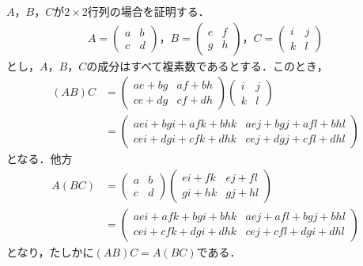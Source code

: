 \begin{tproof}
  $A$，$B$，$C$が$2 \times 2$行列の場合を証明する．
  \begin{gather*}
    A=
    \begin{pmatrix}
      a & b \\
      c & d
    \end{pmatrix}
    ，
    B=
    \begin{pmatrix}
      e & f \\
      g & h
    \end{pmatrix}
    ，C=
    \begin{pmatrix}
      i & j \\
      k & l
    \end{pmatrix}
  \end{gather*}
  とし，$A$，$B$，$C$の成分はすべて複素数であるとする．このとき，
  \begin{align*}
    (AB)C & =
    \begin{pmatrix}
      ae+bg & af+bh \\
      ce+dg & cf+dh
    \end{pmatrix}
    \begin{pmatrix}
      i & j \\
      k & l
    \end{pmatrix}
    \\
          & =
    \begin{pmatrix}
      aei +bgi +afk +bhk & aej+bgj+afl+bhl     \\
      cei +dgi+cfk +dhk  & cej +dgj + cfl +dhl
    \end{pmatrix}
  \end{align*}
  となる．他方
  \begin{align*}
    A(BC) & =
    \begin{pmatrix}
      a & b \\
      c & d
    \end{pmatrix}
    \begin{pmatrix}
      ei + fk & ej +fl \\
      gi + hk & gj +hl
    \end{pmatrix}
    \\
          & =
    \begin{pmatrix}
      aei + afk +bgi +bhk  & aej +afl +bgj +bhl   \\
      cei + cfk + dgi +dhk & cej + cfl + dgi +dhl
    \end{pmatrix}
  \end{align*}
  となり，たしかに$(AB)C=A(BC)$である．
\end{tproof}
%

